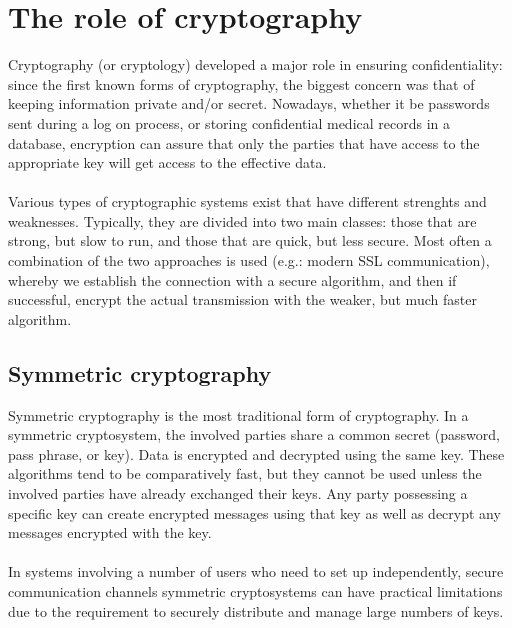 \documentclass[Lau,binding=0.6cm,oneside]{sapthesis}
\begin{document}
\section{The role of cryptography}
Cryptography (or cryptology) developed a major role in ensuring confidentiality: since the first known forms of cryptography, the biggest concern was that of keeping information private and/or secret. Nowadays, whether it be passwords sent during a log on process, or storing confidential medical records in a database, encryption can assure that only the parties that have access to the appropriate key will get access to the effective data.\\\\
Various types of cryptographic systems exist that have different strenghts and weaknesses. Typically, they are divided into two main classes: those that are strong, but slow to run, and those that are quick, but less secure. Most often a combination of the two approaches is used (e.g.: modern SSL communication), whereby we establish the connection with a secure algorithm, and then if successful, encrypt the actual transmission with the weaker, but much faster algorithm.

\subsection{Symmetric cryptography}
Symmetric cryptography is the most traditional form of cryptography. In a symmetric cryptosystem, the involved parties share a common secret (password, pass phrase, or key). Data is encrypted and decrypted using the same key\supercite{symmetric}. These algorithms tend to be comparatively fast, but they cannot be used unless the involved parties have already exchanged their keys. Any party possessing a specific key can create encrypted messages using that key as well as decrypt any messages encrypted with the key.\\\\
In systems involving a number of users who need to set up independently, secure communication channels symmetric cryptosystems can have practical limitations due to the requirement to securely distribute and manage large numbers of keys.
\end{document}
